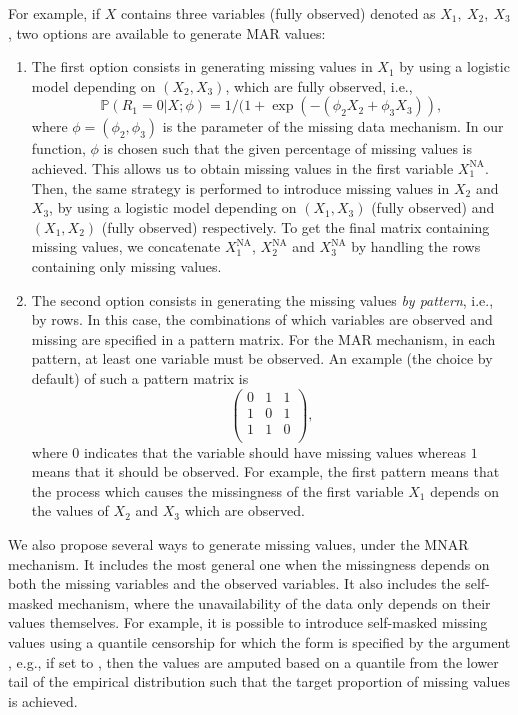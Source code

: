 For example, if $X$ contains three variables (fully observed) denoted as $X_{1},\ X_{2},\ X_{3}$, two options are available to generate MAR values:
\begin{enumerate}
    \item The first option consists in generating missing values in $X_{1}$ by using a logistic model depending on $(X_2,X_3)$, which are fully observed, i.e., 
    \begin{equation}\label{eq:logmod}
    \mathbb{P}(R_1=0|X;\phi)=1/(1+\exp(-(\phi_2 X_2+\phi_3 X_3)),
    \end{equation}
    where $\phi=(\phi_2,\phi_3)$ is the parameter of the missing data mechanism. In our function, $\phi$ is chosen such that the given percentage of missing values is achieved. This allows us to obtain missing values in the first variable $X_1^{\mathrm{NA}}$. Then, the same strategy is performed to introduce missing values in $X_2$ and $X_3$, by using a logistic model depending on $(X_1,X_3)$ (fully observed) and $(X_1,X_2)$ (fully observed) respectively. To get the final matrix containing missing values, we concatenate $X_1^{\mathrm{NA}}$, $X_2^{\mathrm{NA}}$ and $X_3^{\mathrm{NA}}$ by handling the rows containing only missing values. 

    \item The second option consists in generating the missing values \textit{by pattern}, i.e., by rows. In this case, the combinations of which variables are observed and missing are specified in a pattern matrix. For the MAR mechanism, in each pattern, at least one variable must be observed. %
    An example (the choice by default) of such a pattern matrix is 
    $$\begin{pmatrix}
    0 & 1 & 1 \\
    1 & 0 & 1 \\
    1 & 1 & 0 \\
    \end{pmatrix},$$ where $0$ indicates that the variable should have missing values whereas $1$ means that it should be observed. For example, the first pattern means that the process which causes the missingness of the first variable $X_1$ depends on the values of $X_2$ and $X_3$ which are observed. 
\end{enumerate}

We also propose several ways to generate missing values, under the MNAR mechanism. It includes the most general one when the missingness depends on both the missing variables and the observed variables. It also includes the self-masked mechanism, where the unavailability of the data only depends on their values themselves.
For example, it is possible to introduce self-masked missing values using a quantile censorship for which the form is specified by the argument , e.g., if set to , then the values are amputed based on a quantile from the lower tail of the empirical distribution such that the target proportion of missing values is achieved. 


